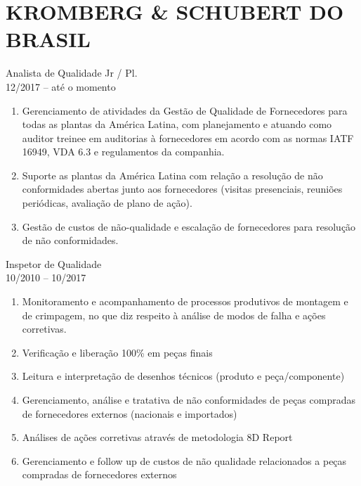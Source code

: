 \documentclass[10.5pt, a4paper]{report}
\begin{document}
\vspace{10pt}
\section{KROMBERG \& SCHUBERT DO BRASIL}

Analista de Qualidade Jr / Pl.
\vspace{3pt}\\
{\footnotesize 12/2017 – até o momento}
\begin{enumerate}[leftmargin=32pt, topsep=15pt, itemsep=8pt, labelsep=10pt, align=left]
  \item Gerenciamento de atividades da Gestão de Qualidade de Fornecedores para todas as plantas da América Latina, com planejamento e atuando como auditor treinee em auditorias à fornecedores em acordo com as normas IATF 16949, VDA 6.3 e regulamentos da companhia.
  \item Suporte as plantas da América Latina com relação a resolução de não conformidades abertas junto aos fornecedores (visitas presenciais, reuniões periódicas, avaliação de plano de ação).
  \item Gestão de custos de não-qualidade e escalação de fornecedores para resolução de não conformidades.
\end{enumerate}

Inspetor de Qualidade
\vspace{3pt}\\
{\footnotesize 10/2010 – 10/2017}
\begin{enumerate}[leftmargin=32pt, topsep=15pt, itemsep=8pt, labelsep=10pt, align=left]
  \item Monitoramento e acompanhamento de processos produtivos de montagem e de crimpagem, no que diz respeito à análise de modos de falha e ações corretivas.
  \item Verificação e liberação 100\% em peças finais
  \item Leitura e interpretação de desenhos técnicos (produto e peça/componente)
  \item Gerenciamento, análise e tratativa de não conformidades de peças compradas de fornecedores externos (nacionais e importados)
  \item Análises de ações corretivas através de metodologia 8D Report
  \item Gerenciamento e follow up de custos de não qualidade relacionados a peças compradas de fornecedores externos
\end{enumerate}
\end{document}
